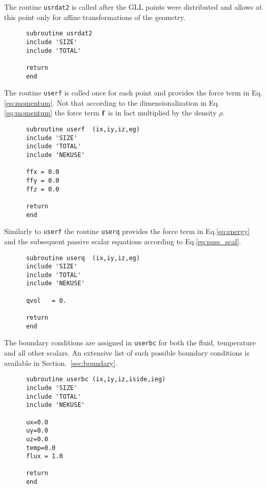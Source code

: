 The routine {\tt usrdat2} is called after the GLL points were distributed and allows at this point only for affine transformations of the geometry.
\begin{lstlisting}
      subroutine usrdat2
      include 'SIZE'
      include 'TOTAL'

      return
      end
\end{lstlisting}

The routine {\tt userf} is called once for each point and provides the force term in Eq.\ref{eq:momentum}. Not that according to the dimensionalization in Eq.\ref{eq:momentum} the force term \(\mathbf{f}\) is in fact multiplied by the density \(\rho\).
\begin{lstlisting}
      subroutine userf  (ix,iy,iz,eg)
      include 'SIZE'
      include 'TOTAL'
      include 'NEKUSE'

      ffx = 0.0
      ffy = 0.0
      ffz = 0.0

      return
      end
\end{lstlisting}

Similarly to {\tt userf} the routine {\tt userq} provides the force term in Eq.\ref{eq:energy} and the subsequent passive scalar equations according to Eq.\ref{eq:pass_scal}.
\begin{lstlisting}	
      subroutine userq  (ix,iy,iz,eg)
      include 'SIZE'
      include 'TOTAL'
      include 'NEKUSE'
      
      qvol   = 0.

      return
      end
      \end{lstlisting}
      
      The boundary conditions are assigned in {\tt userbc} for both the fluid, temperature and all other scalars. An extensive list of such possible boundary conditions is available in Section.~\ref{sec:boundary}. 
      \begin{lstlisting}
      subroutine userbc (ix,iy,iz,iside,ieg)
      include 'SIZE'
      include 'TOTAL'
      include 'NEKUSE'

      ux=0.0
      uy=0.0
      uz=0.0
      temp=0.0
      flux = 1.0
      
      return
      end
\end{lstlisting}

